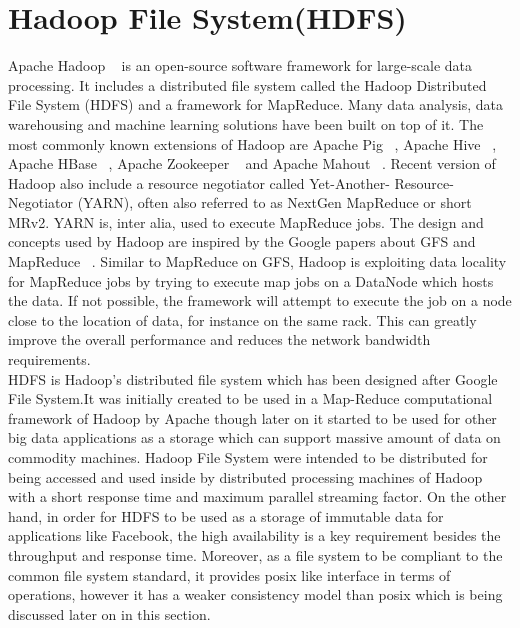 \section{Hadoop File System(HDFS)}
Apache Hadoop ~\cite{h17} is an open-source software framework for large-scale data
processing. It includes a distributed file system called the Hadoop Distributed
File System (HDFS) and a framework for MapReduce. Many data analysis,
data warehousing and machine learning solutions have been built on top of it.
The most commonly known extensions of Hadoop are Apache Pig ~\cite{21}, Apache
Hive ~\cite{22}, Apache HBase  ~\cite{26}, Apache Zookeeper  ~\cite{27} and Apache Mahout  ~\cite{23}.
Recent version of Hadoop also include a resource negotiator called Yet-Another-
Resource-Negotiator (YARN), often also referred to as NextGen MapReduce or
short MRv2. YARN is, inter alia, used to execute MapReduce jobs. The design
and concepts used by Hadoop are inspired by the Google papers about GFS and
MapReduce ~\cite[p.~9]{h17}. Similar to MapReduce on GFS, Hadoop is exploiting data
locality for MapReduce jobs by trying to execute map jobs on a DataNode which
hosts the data. If not possible, the framework will attempt to execute the job
on a node close to the location of data, for instance on the same rack. This can
greatly improve the overall performance  and reduces the network bandwidth
requirements.\\
 HDFS  is   Hadoop’s   distributed  file  system   which  has   been  designed  after  Google  File System.It was initially created to be used in a Map-Reduce computational framework of Hadoop by Apache though later on it started to be used for other big data applications as a storage which can support massive amount of data on commodity machines. Hadoop File System were intended to be distributed for being accessed and used inside by distributed processing machines of Hadoop with a short response time and maximum parallel streaming factor. On the other hand, in order for HDFS to be used as a storage of immutable data for applications like Facebook, the high availability is a key requirement besides the throughput and response time. Moreover, as a file system to be compliant to the common file system standard, it provides posix like interface in terms of operations, however it has a weaker consistency model than posix which is being discussed later on in this section.
